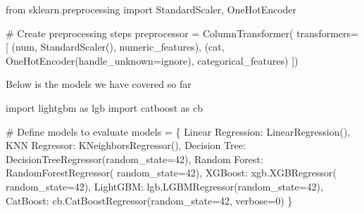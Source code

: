 \documentclass[
  letterpaper,
  DIV=11,
  numbers=noendperiod]{scrreprt}
\newenvironment{Shaded}{\begin{snugshade}}{\end{snugshade}}
\newcommand{\CommentTok}[1]{\textcolor[rgb]{0.37,0.37,0.37}{#1}}
\newcommand{\DecValTok}[1]{\textcolor[rgb]{0.68,0.00,0.00}{#1}}
\newcommand{\ImportTok}[1]{\textcolor[rgb]{0.00,0.46,0.62}{#1}}
\newcommand{\NormalTok}[1]{\textcolor[rgb]{0.00,0.23,0.31}{#1}}
\newcommand{\OperatorTok}[1]{\textcolor[rgb]{0.37,0.37,0.37}{#1}}
\newcommand{\StringTok}[1]{\textcolor[rgb]{0.13,0.47,0.30}{#1}}
\begin{document}
\begin{Shaded}
\begin{Highlighting}[]

\ImportTok{from}\NormalTok{ sklearn.preprocessing }\ImportTok{import}\NormalTok{ StandardScaler, OneHotEncoder}

\CommentTok{\# Create preprocessing steps}
\NormalTok{preprocessor }\OperatorTok{=}\NormalTok{ ColumnTransformer(}
\NormalTok{    transformers}\OperatorTok{=}\NormalTok{[}
\NormalTok{        (}\StringTok{\textquotesingle{}num\textquotesingle{}}\NormalTok{, StandardScaler(), numeric\_features),}
\NormalTok{        (}\StringTok{\textquotesingle{}cat\textquotesingle{}}\NormalTok{, OneHotEncoder(handle\_unknown}\OperatorTok{=}\StringTok{\textquotesingle{}ignore\textquotesingle{}}\NormalTok{), categorical\_features)}
\NormalTok{    ])}
\end{Highlighting}
\end{Shaded}

Below is the models we have covered so far

\begin{Shaded}
\begin{Highlighting}[]
\ImportTok{import}\NormalTok{ lightgbm }\ImportTok{as}\NormalTok{ lgb}
\ImportTok{import}\NormalTok{ catboost }\ImportTok{as}\NormalTok{ cb}

\CommentTok{\# Define models to evaluate}
\NormalTok{models }\OperatorTok{=}\NormalTok{ \{}
    \StringTok{\textquotesingle{}Linear Regression\textquotesingle{}}\NormalTok{: LinearRegression(),}
    \StringTok{\textquotesingle{}KNN Regressor\textquotesingle{}}\NormalTok{: KNeighborsRegressor(),}
    \StringTok{\textquotesingle{}Decision Tree\textquotesingle{}}\NormalTok{: DecisionTreeRegressor(random\_state}\OperatorTok{=}\DecValTok{42}\NormalTok{),}
    \StringTok{\textquotesingle{}Random Forest\textquotesingle{}}\NormalTok{: RandomForestRegressor( random\_state}\OperatorTok{=}\DecValTok{42}\NormalTok{),}
    \StringTok{\textquotesingle{}XGBoost\textquotesingle{}}\NormalTok{: xgb.XGBRegressor( random\_state}\OperatorTok{=}\DecValTok{42}\NormalTok{),}
    \StringTok{\textquotesingle{}LightGBM\textquotesingle{}}\NormalTok{: lgb.LGBMRegressor(random\_state}\OperatorTok{=}\DecValTok{42}\NormalTok{),}
    \StringTok{\textquotesingle{}CatBoost\textquotesingle{}}\NormalTok{: cb.CatBoostRegressor(random\_state}\OperatorTok{=}\DecValTok{42}\NormalTok{, verbose}\OperatorTok{=}\DecValTok{0}\NormalTok{)}
\NormalTok{\}}
\end{Highlighting}
\end{Shaded}
\end{document}
